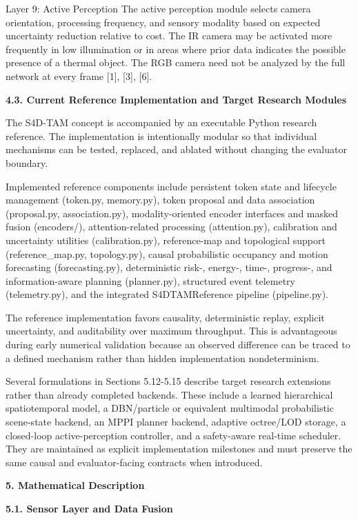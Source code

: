 \documentclass[
]{article}
\begin{document}
Layer 9: Active Perception The active perception module selects camera
orientation, processing frequency, and sensory modality based on
expected uncertainty reduction relative to cost. The IR camera may be
activated more frequently in low illumination or in areas where prior
data indicates the possible presence of a thermal object. The RGB camera
need not be analyzed by the full network at every frame {[}1{]},
{[}3{]}, {[}6{]}.

\textbf{4.3. Current Reference Implementation and Target Research
Modules}

The S4D-TAM concept is accompanied by an executable Python research
reference. The implementation is intentionally modular so that
individual mechanisms can be tested, replaced, and ablated without
changing the evaluator boundary.

Implemented reference components include persistent token state and
lifecycle management (token.py, memory.py), token proposal and data
association (proposal.py, association.py), modality-oriented encoder
interfaces and masked fusion (encoders/), attention-related processing
(attention.py), calibration and uncertainty utilities (calibration.py),
reference-map and topological support (reference\_map.py, topology.py),
causal probabilistic occupancy and motion forecasting (forecasting.py),
deterministic risk-, energy-, time-, progress-, and information-aware
planning (planner.py), structured event telemetry (telemetry.py), and
the integrated S4DTAMReference pipeline (pipeline.py).

The reference implementation favors causality, deterministic replay,
explicit uncertainty, and auditability over maximum throughput. This is
advantageous during early numerical validation because an observed
difference can be traced to a defined mechanism rather than hidden
implementation nondeterminism.

Several formulations in Sections 5.12-5.15 describe target research
extensions rather than already completed backends. These include a
learned hierarchical spatiotemporal model, a DBN/particle or equivalent
multimodal probabilistic scene-state backend, an MPPI planner backend,
adaptive octree/LOD storage, a closed-loop active-perception controller,
and a safety-aware real-time scheduler. They are maintained as explicit
implementation milestones and must preserve the same causal and
evaluator-facing contracts when introduced.

\textbf{5. Mathematical Description}

\textbf{5.1. Sensor Layer and Data Fusion}
\end{document}
